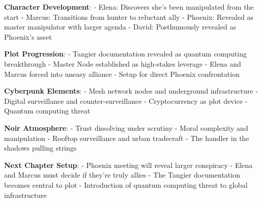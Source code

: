 \textbf{Character Development}: - Elena: Discovers she's been manipulated from the start - Marcus: Transitions from hunter to reluctant ally - Phoenix: Revealed as master manipulator with larger agenda - David: Posthumously revealed as Phoenix's asset

\textbf{Plot Progression}: - Tangier documentation revealed as quantum computing breakthrough - Master Node established as high-stakes leverage - Elena and Marcus forced into uneasy alliance - Setup for direct Phoenix confrontation

\textbf{Cyberpunk Elements}: - Mesh network nodes and underground infrastructure - Digital surveillance and counter-surveillance - Cryptocurrency as plot device - Quantum computing threat

\textbf{Noir Atmosphere}: - Trust dissolving under scrutiny - Moral complexity and manipulation - Rooftop surveillance and urban tradecraft - The handler in the shadows pulling strings

\textbf{Next Chapter Setup}: - Phoenix meeting will reveal larger conspiracy - Elena and Marcus must decide if they're truly allies - The Tangier documentation becomes central to plot - Introduction of quantum computing threat to global infrastructure
